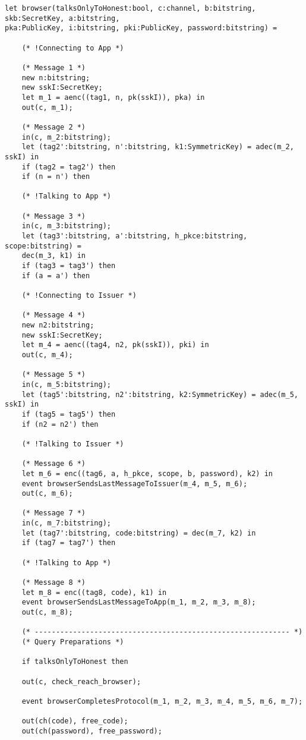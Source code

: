 \begin{Verbatim}[fontsize=\small]
let browser(talksOnlyToHonest:bool, c:channel, b:bitstring, skb:SecretKey, a:bitstring,
pka:PublicKey, i:bitstring, pki:PublicKey, password:bitstring) =

    (* !Connecting to App *)

    (* Message 1 *)
    new n:bitstring;
    new sskI:SecretKey;
    let m_1 = aenc((tag1, n, pk(sskI)), pka) in
    out(c, m_1);

    (* Message 2 *)
    in(c, m_2:bitstring);
    let (tag2':bitstring, n':bitstring, k1:SymmetricKey) = adec(m_2, sskI) in
    if (tag2 = tag2') then
    if (n = n') then

    (* !Talking to App *)

    (* Message 3 *)
    in(c, m_3:bitstring);
    let (tag3':bitstring, a':bitstring, h_pkce:bitstring, scope:bitstring) = 
    dec(m_3, k1) in
    if (tag3 = tag3') then
    if (a = a') then

    (* !Connecting to Issuer *)

    (* Message 4 *)
    new n2:bitstring;
    new sskI:SecretKey;
    let m_4 = aenc((tag4, n2, pk(sskI)), pki) in
    out(c, m_4);

    (* Message 5 *)
    in(c, m_5:bitstring);
    let (tag5':bitstring, n2':bitstring, k2:SymmetricKey) = adec(m_5, sskI) in
    if (tag5 = tag5') then
    if (n2 = n2') then

    (* !Talking to Issuer *)

    (* Message 6 *)
    let m_6 = enc((tag6, a, h_pkce, scope, b, password), k2) in
    event browserSendsLastMessageToIssuer(m_4, m_5, m_6);
    out(c, m_6);

    (* Message 7 *)
    in(c, m_7:bitstring);
    let (tag7':bitstring, code:bitstring) = dec(m_7, k2) in
    if (tag7 = tag7') then

    (* !Talking to App *)

    (* Message 8 *)
    let m_8 = enc((tag8, code), k1) in
    event browserSendsLastMessageToApp(m_1, m_2, m_3, m_8);
    out(c, m_8);

    (* ------------------------------------------------------------ *)
    (* Query Preparations *)

    if talksOnlyToHonest then

    out(c, check_reach_browser);

    event browserCompletesProtocol(m_1, m_2, m_3, m_4, m_5, m_6, m_7);

    out(ch(code), free_code);
    out(ch(password), free_password);


\end{Verbatim}
